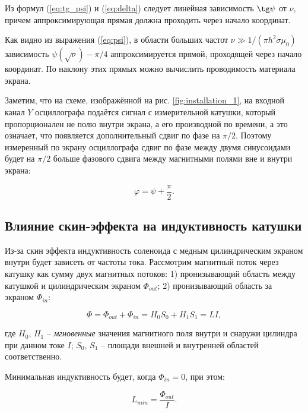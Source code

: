 \documentclass[a4paper, 12pt]{article}
\begin{document}
    Из формул (\ref{eq:tg_psi}) и (\ref{eq:delta}) следует линейная зависимость $\tg\psi$ от $\nu$, причем аппроксимирующая прямая должна проходить через начало координат.
    
    Как видно из выражения (\ref{eq:psi}), в области больших частот $\nu \gg 1/(\pi h^2 \sigma \mu_0)$ зависимость $\psi(\sqrt{\nu}) - \pi/4$ аппроксимируется прямой, проходящей через начало координат. По наклону этих прямых можно вычислить проводимость материала экрана.

    Заметим, что на схеме, изображённой на рис. \ref{fig:installation_1}, на входной канал $Y$ осциллографа подаётся сигнал с измерительной катушки, который пропорционален не полю внутри экрана, а его производной по времени, а это означает, что появляется дополнительный сдвиг по фазе на $\pi/2$. Поэтому измеренный по экрану осциллографа сдвиг по фазе между двумя синусоидами будет на $\pi/2$ больше фазового сдвига между магнитными полями вне и внутри экрана:

    \begin{equation}
        \varphi = \psi + \frac{\pi}{2}.
    \end{equation}

    \subsection{Влияние скин-эффекта на индуктивность катушки}

    Из-за скин эффекта индуктивность соленоида с медным цилиндрическим экраном внутри будет зависеть от частоты тока. Рассмотрим магнитный поток через катушку как сумму двух магнитных потоков: 1) пронизывающий область между катушкой и цилиндрическим экраном $\Phi_{out}$; 2) пронизывающий область за экраном $\Phi_{in}$:

    \begin{equation}
        \Phi = \Phi_{out} + \Phi_{in} = H_0 S_0 + H_1 S_1 = LI,
    \end{equation}

    где $H_0$, $H_1$ -- \textit{мгновенные} значения магнитного поля внутри и снаружи цилиндра при данном токе $I$; $S_0$, $S_1$ -- площади внешней и внутренней областей соответственно.

    Минимальная индуктивность будет, когда $\Phi_{in} = 0$, при этом:

    \begin{equation}
        L_{min} = \frac{\Phi_{out}}{I}.
    \end{equation}
\end{document}
